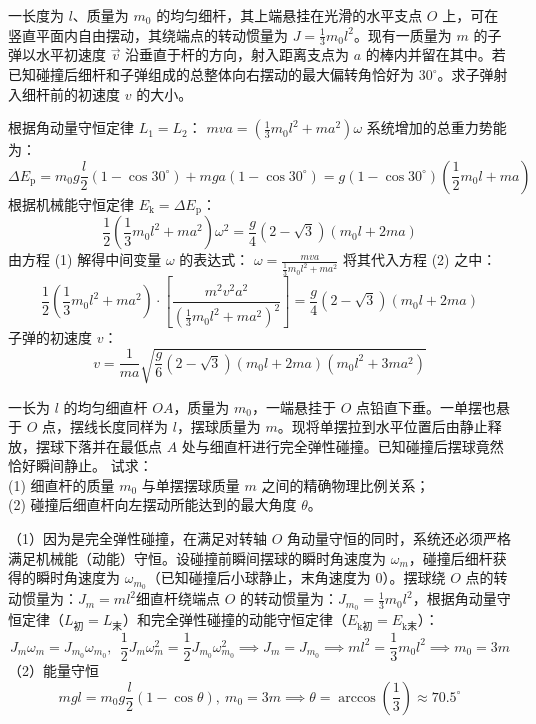 \begin{example}
一长度为 $l$、质量为 $m_0$ 的均匀细杆，其上端悬挂在光滑的水平支点 $O$ 上，可在竖直平面内自由摆动，其绕端点的转动惯量为 $J = \frac{1}{3}m_0 l^2$。现有一质量为 $m$ 的子弹以水平初速度 $\vec{v}$ 沿垂直于杆的方向，射入距离支点为 $a$ 的棒内并留在其中。若已知碰撞后细杆和子弹组成的总整体向右摆动的最大偏转角恰好为 $30^\circ$。求子弹射入细杆前的初速度 $v$ 的大小。
\end{example}
\begin{solution}
根据角动量守恒定律 $L_1 = L_2$： \(m v a = \left( \frac{1}{3}m_0 l^2 + m a^2 \right) \omega\) 
系统增加的总重力势能为：$$\Delta E_{\text{p}} = m_0 g \frac{l}{2}(1 - \cos 30^\circ) + m g a (1 - \cos 30^\circ) = g(1 - \cos 30^\circ) \left( \frac{1}{2}m_0 l + m a \right)$$根据机械能守恒定律 $E_{\text{k}} = \Delta E_{\text{p}}$：$$\frac{1}{2}\left( \frac{1}{3}m_0 l^2 + m a^2 \right)\omega^2 = \frac{g}{4}(2 - \sqrt{3})(m_0 l + 2ma)$$
由方程 (1) 解得中间变量 $\omega$ 的表达式： \(\omega = \frac{m v a}{\frac{1}{3}m_0 l^2 + m a^2}\) 将其代入方程 (2) 之中：$$\frac{1}{2}\left( \frac{1}{3}m_0 l^2 + m a^2 \right) \cdot \left[ \frac{m^2 v^2 a^2}{\left(\frac{1}{3}m_0 l^2 + m a^2\right)^2} \right] = \frac{g}{4}(2 - \sqrt{3})(m_0 l + 2ma)$$子弹的初速度 $v$：$$\boxed{v = \frac{1}{ma}\sqrt{\frac{g}{6}(2 - \sqrt{3})(m_0 l + 2ma)(m_0 l^2 + 3ma^2)}}$$
\end{solution}

\begin{example}
一长为 $l$ 的均匀细直杆 $OA$，质量为 $m_0$，一端悬挂于 $O$ 点铅直下垂。一单摆也悬于 $O$ 点，摆线长度同样为 $l$，摆球质量为 $m$。现将单摆拉到水平位置后由静止释放，摆球下落并在最低点 $A$ 处与细直杆进行完全弹性碰撞。已知碰撞后摆球竟然恰好瞬间静止。
试求：\\
(1) 细直杆的质量 $m_0$ 与单摆摆球质量 $m$ 之间的精确物理比例关系；\\
(2) 碰撞后细直杆向左摆动所能达到的最大角度 $\theta$。
\end{example}
\begin{solution}
（1）因为是完全弹性碰撞，在满足对转轴 $O$ 角动量守恒的同时，系统还必须严格满足机械能（动能）守恒。设碰撞前瞬间摆球的瞬时角速度为 $\omega_m$，碰撞后细杆获得的瞬时角速度为 $\omega_{m_0}$（已知碰撞后小球静止，末角速度为 0）。摆球绕 $O$ 点的转动惯量为：$J_m = ml^2$细直杆绕端点 $O$ 的转动惯量为：$J_{m_0} = \frac{1}{3}m_0 l^2$，根据角动量守恒定律（$L_{\text{初}} = L_{\text{末}}$）和完全弹性碰撞的动能守恒定律（$E_{\text{k}\text{初}} = E_{\text{k}\text{末}}$）：
$$J_m \omega_m = J_{m_0} \omega_{m_0},~~\frac{1}{2}J_m \omega_m^2 = \frac{1}{2}J_{m_0} \omega_{m_0}^2 \implies J_m = J_{m_0}\implies ml^2 = \frac{1}{3}m_0 l^2\implies m_0=3m$$
（2）能量守恒$$mgl = m_0 g \frac{l}{2}(1 - \cos\theta),~m_0=3m\implies\theta = \arccos\left(\frac{1}{3}\right) \approx 70.5^\circ$$
\end{solution}
